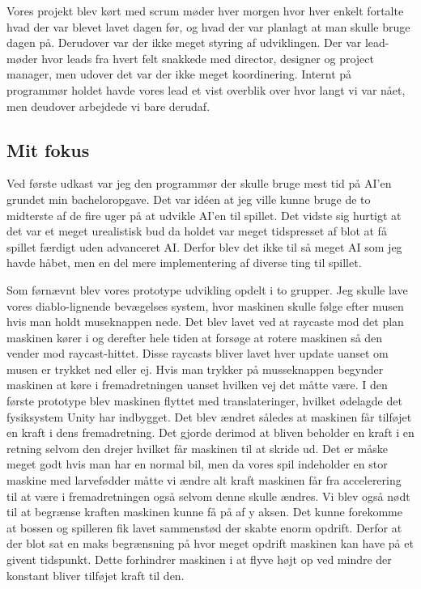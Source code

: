 Vores projekt blev kørt med scrum møder hver morgen hvor hver enkelt fortalte hvad der var blevet  lavet dagen før, og hvad der var planlagt at man skulle bruge dagen på.
Derudover var der ikke meget styring af udviklingen. Der var lead-møder hvor leads fra hvert felt snakkede med director, designer og project manager, men udover det var der ikke meget koordinering. Internt på programmør holdet havde vores lead et vist overblik over hvor langt vi var nået, men deudover arbejdede vi bare derudaf.




\subsection{Mit fokus}
Ved første udkast var jeg den programmør der skulle bruge mest tid på AI'en grundet min bacheloropgave. Det var idéen at jeg ville kunne bruge de to midterste af de fire uger på at udvikle AI'en til spillet. Det vidste sig hurtigt at det var et meget urealistisk bud da holdet var meget tidspresset af blot at få spillet færdigt uden advanceret AI. Derfor blev det ikke til så meget AI som jeg havde håbet, men en del mere implementering af diverse ting til spillet.

Som førnævnt blev vores prototype udvikling opdelt i to grupper. Jeg skulle lave vores diablo-lignende bevægelses system, hvor maskinen skulle følge efter musen hvis man holdt museknappen nede. Det blev lavet ved at raycaste mod det plan maskinen kører i og derefter hele tiden at forsøge at rotere maskinen så den vender mod raycast-hittet. Disse raycasts bliver lavet hver update uanset om musen er trykket ned eller ej. Hvis man trykker på musseknappen begynder maskinen at køre i fremadretningen uanset hvilken vej det måtte være. I den første prototype blev maskinen flyttet med translateringer, hvilket ødelagde det fysiksystem Unity har indbygget. Det blev ændret således at maskinen får tilføjet en kraft i dens fremadretning. Det gjorde derimod at bliven beholder en kraft i en retning selvom den drejer hvilket får maskinen til at skride ud. Det er måske meget godt hvis man har en normal bil, men da vores spil indeholder en stor maskine med larvefødder måtte vi ændre alt kraft maskinen får fra accelerering til at være i fremadretningen også selvom denne skulle ændres. 
Vi blev også nødt til at begrænse kraften maskinen kunne få på af y aksen. Det kunne forekomme at bossen og spilleren fik lavet sammenstød der skabte enorm opdrift. Derfor at der blot sat en maks begrænsning på hvor meget opdrift maskinen kan have på et givent tidspunkt. Dette forhindrer maskinen i at flyve højt op ved mindre der konstant bliver tilføjet kraft til den.

